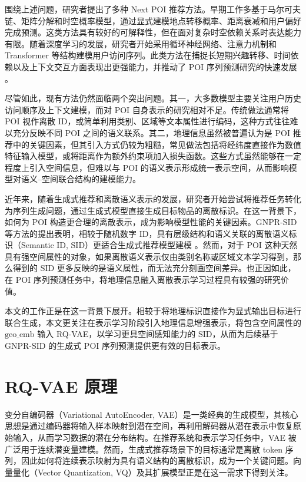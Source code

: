 围绕上述问题，研究者提出了多种 Next POI 推荐方法。早期工作多基于马尔可夫链、矩阵分解和时空概率模型，通过显式建模地点转移概率、距离衰减和用户偏好完成预测。这类方法具有较好的可解释性，但在面对复杂时空依赖关系时表达能力有限。随着深度学习的发展，研究者开始采用循环神经网络、注意力机制和 Transformer 等结构建模用户访问序列。此类方法在捕捉长短期兴趣转移、时间依赖以及上下文交互方面表现出更强能力，并推动了 POI 序列预测研究的快速发展 \cite{feng2018deepmove,yang2020flashback,luo2021stan,kang2018sasrec}。

尽管如此，现有方法仍然面临两个突出问题。其一，大多数模型主要关注用户历史访问顺序及上下文建模，而对 POI 自身表示的研究相对不足。传统做法通常将 POI 视作离散 ID，或简单利用类别、区域等文本属性进行编码，这种方式往往难以充分反映不同 POI 之间的语义联系。其二，地理信息虽然被普遍认为是 POI 推荐中的关键因素，但其引入方式仍较为粗糙，常见做法包括将经纬度直接作为数值特征输入模型，或将距离作为额外约束项加入损失函数。这些方式虽然能够在一定程度上引入空间信息，但难以与 POI 的语义表示形成统一表示空间，从而影响模型对语义--空间联合结构的建模能力。

近年来，随着生成式推荐和离散语义表示的发展，研究者开始尝试将推荐任务转化为序列生成问题，通过生成式模型直接生成目标物品的离散标识。在这一背景下，如何为 POI 构造更合理的离散表示，成为影响模型性能的关键因素。GNPR-SID 等方法的提出表明，相较于随机数字 ID，具有层级结构和语义关联的离散语义标识（Semantic ID, SID）更适合生成式推荐模型建模 \cite{rajput2023tiger,wang2025gnprsid}。然而，对于 POI 这种天然具有强空间属性的对象，如果离散语义表示仅由类别名称或区域文本学习得到，那么得到的 SID 更多反映的是语义属性，而无法充分刻画空间差异。也正因如此，在 POI 序列预测任务中，将地理信息融入离散表示学习过程具有较强的研究价值。

本文的工作正是在这一背景下展开。相较于将地理标识直接作为显式输出目标进行联合生成，本文更关注在表示学习阶段引入地理信息增强表示，将包含空间属性的 $\mathrm{geo\_emb}$ 输入 RQ-VAE，以学习更具空间感知能力的 SID，从而为后续基于 GNPR-SID 的生成式 POI 序列预测提供更有效的目标表示。

\section{RQ-VAE 原理}
\label{sec:rqvae}

变分自编码器（Variational AutoEncoder, VAE）是一类经典的生成模型，其核心思想是通过编码器将输入样本映射到潜在空间，再利用解码器从潜在表示中恢复原始输入，从而学习数据的潜在分布结构。在推荐系统和表示学习任务中，VAE 被广泛用于连续潜变量建模。然而，生成式推荐场景下的目标通常是离散 token 序列，因此如何将连续表示映射为具有语义结构的离散标识，成为一个关键问题。向量量化（Vector Quantization, VQ）及其扩展模型正是在这一需求下得到关注。

